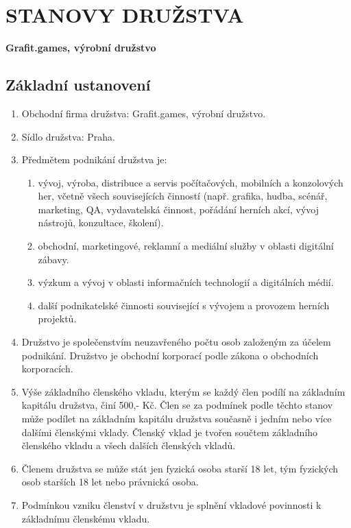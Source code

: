 \chapter{STANOVY DRUŽSTVA}
\textbf{\Large Grafit.games, výrobní družstvo}

\section{Základní ustanovení}
\begin{enumerate}
    \item Obchodní firma družstva: Grafit.games, výrobní družstvo.
    \item Sídlo družstva: Praha.
    \item Předmětem podnikání družstva je:
        \begin{enumerate}[label=\alph*.]
            \item vývoj, výroba, distribuce a servis počítačových, mobilních a konzolových her, včetně všech souvisejících činností (např. grafika, hudba, scénář, marketing, QA, vydavatelská činnost, pořádání herních akcí, vývoj nástrojů, konzultace, školení).
            \item obchodní, marketingové, reklamní a mediální služby v oblasti digitální zábavy.
            \item výzkum a vývoj v oblasti informačních technologií a digitálních médií.
            \item další podnikatelské činnosti související s vývojem a provozem herních projektů.
        \end{enumerate}
    \item Družstvo je společenstvím neuzavřeného počtu osob založeným za účelem podnikání. Družstvo je obchodní korporací podle zákona o obchodních korporacích.
    \item Výše základního členského vkladu, kterým se každý člen podílí na základním kapitálu družstva, činí 500,- Kč. Člen se za podmínek podle těchto stanov může podílet na základním kapitálu družstva současně i jedním nebo více dalšími členskými vklady. Členský vklad je tvořen součtem základního členského vkladu a všech dalších členských vkladů.
    \item Členem družstva se může stát jen fyzická osoba starší 18 let, tým fyzických osob starších 18 let nebo právnická osoba.
    \item Podmínkou vzniku členství v družstvu je splnění vkladové povinnosti k základnímu členskému vkladu.

\end{enumerate}
